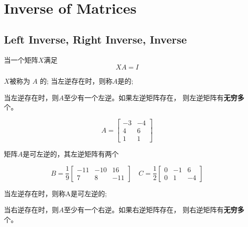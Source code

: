 \chapter{Inverse of Matrices}

\section{Left Inverse, Right Inverse, Inverse}

\begin{definition}[$A$的左逆]
    当一个矩阵$X$满足 \begin{equation} X A=I \end{equation} 
    
    $X$被称为 $ A $ 的; 当左逆存在时，则称$A$是的;
\end{definition}

当左逆存在时，则$A$至少有一个左逆。如果左逆矩阵存在， 则左逆矩阵有\textbf{无穷多}个。

\begin{example}
    \begin{equation} A=\left[\begin{array}{cc}-3 & -4 \\ 4 & 6 \\ 1 & 1\end{array}\right] \end{equation}

    矩阵$A$是可左逆的，其左逆矩阵有两个

    \begin{equation} B=\frac{1}{9}\left[\begin{array}{ccc}-11 & -10 & 16 \\ 7 & 8 & -11\end{array}\right] \quad C=\frac{1}{2}\left[\begin{array}{ccc}0 & -1 & 6 \\ 0 & 1 & -4\end{array}\right] \end{equation}
\end{example}

\begin{definition}[$A$的右逆]
    当左逆存在时，则称A是可左逆的;
\end{definition}

当右逆存在时，则$A$至少有一个右逆。如果右逆矩阵存在， 则右逆矩阵有\textbf{无穷多}个。


